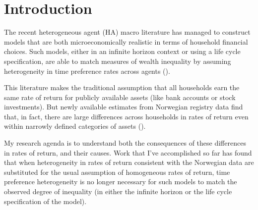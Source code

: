 \documentclass[\econtexRoot/Chp1proposal]{subfiles}
\begin{document}
\hypertarget{Introduction}{}
\section{Introduction}\notinsubfile{\label{sec:intro}}
\setcounter{page}{0}

\par The recent heterogeneous agent (HA) macro literature has managed to construct models that are both microeconomically realistic in terms of household financial choices. Such models, either in an infinite horizon context or using a life cycle specification, are able to match measures of wealth inequality by assuming heterogeneity in time preference rates across agents (\cite{cstw2017}).

\par This literature makes the traditional assumption that all households earn the same rate of return for publicly available assets (like bank accounts or stock investments). But newly available estimates from Norwegian registry data find that, in fact, there are large differences across households in rates of return even within narrowly defined categories of assets (\cite{aflgdmlp20}). %

\par My research agenda is to understand both the consequences of these differences in rates of return, and their causes. Work that I've accomplished so far has found that when heterogeneity in rates of return consistent with the Norwegian data are substituted for the usual assumption of homogeneous rates of return, time preference heterogeneity is no longer necessary for such models to match the observed degree of inequality (in either the infinite horizon or the life cycle specification of the model).

\end{document}
